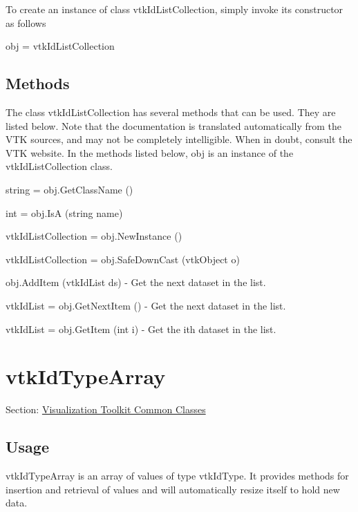 To create an instance of class vtk\-Id\-List\-Collection, simply invoke its constructor as follows \begin{DoxyVerb}  obj = vtkIdListCollection
\end{DoxyVerb}
 \hypertarget{vtkwidgets_vtkxyplotwidget_Methods}{}\subsection{Methods}\label{vtkwidgets_vtkxyplotwidget_Methods}
The class vtk\-Id\-List\-Collection has several methods that can be used. They are listed below. Note that the documentation is translated automatically from the V\-T\-K sources, and may not be completely intelligible. When in doubt, consult the V\-T\-K website. In the methods listed below, {\ttfamily obj} is an instance of the vtk\-Id\-List\-Collection class. 
\begin{DoxyItemize}
\item {\ttfamily string = obj.\-Get\-Class\-Name ()}  
\item {\ttfamily int = obj.\-Is\-A (string name)}  
\item {\ttfamily vtk\-Id\-List\-Collection = obj.\-New\-Instance ()}  
\item {\ttfamily vtk\-Id\-List\-Collection = obj.\-Safe\-Down\-Cast (vtk\-Object o)}  
\item {\ttfamily obj.\-Add\-Item (vtk\-Id\-List ds)} -\/ Get the next dataset in the list.  
\item {\ttfamily vtk\-Id\-List = obj.\-Get\-Next\-Item ()} -\/ Get the next dataset in the list.  
\item {\ttfamily vtk\-Id\-List = obj.\-Get\-Item (int i)} -\/ Get the ith dataset in the list.  
\end{DoxyItemize}\hypertarget{vtkcommon_vtkidtypearray}{}\section{vtk\-Id\-Type\-Array}\label{vtkcommon_vtkidtypearray}
Section\-: \hyperlink{sec_vtkcommon}{Visualization Toolkit Common Classes} \hypertarget{vtkwidgets_vtkxyplotwidget_Usage}{}\subsection{Usage}\label{vtkwidgets_vtkxyplotwidget_Usage}
vtk\-Id\-Type\-Array is an array of values of type vtk\-Id\-Type. It provides methods for insertion and retrieval of values and will automatically resize itself to hold new data.

